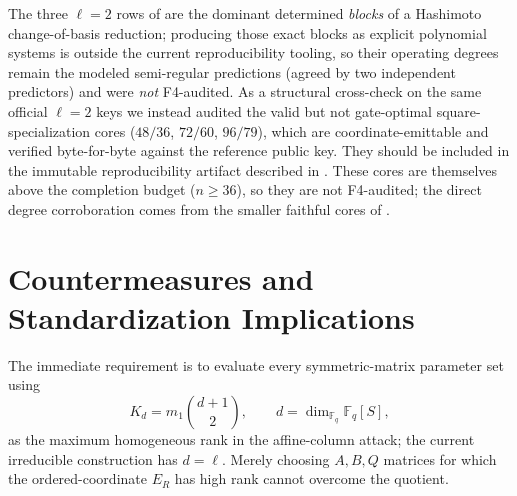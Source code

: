 \documentclass[11pt]{article}
\newcommand{\F}{\mathbb F}
\begin{document}
The three $\ell=2$ rows of  are the dominant determined
\emph{blocks} of a Hashimoto change-of-basis reduction; producing those exact
blocks as explicit polynomial systems is outside the current reproducibility
tooling, so their operating degrees remain the modeled semi-regular predictions
(agreed by two independent predictors) and were \emph{not} F4-audited.  As a
structural cross-check on the same official $\ell=2$ keys we instead audited the
valid but not gate-optimal square-specialization cores ($48/36$, $72/60$,
$96/79$), which are coordinate-emittable and verified byte-for-byte against the
reference public key.  They should be included in the immutable reproducibility
artifact described in .  These cores are themselves above the
completion budget ($n\ge36$), so they are not F4-audited; the direct degree
corroboration comes from the smaller faithful cores of .

\section{Countermeasures and Standardization Implications}\label{sec:countermeasures}

The immediate requirement is to evaluate every symmetric-matrix parameter set using
\[
 K_d=m_1\binom{d+1}{2},
 \qquad d=\dim_{\F_q}\F_q[S],
\]
as the maximum homogeneous rank in the affine-column attack; the current
irreducible construction has $d=\ell$.  Merely choosing $A,B,Q$ matrices for which the ordered-coordinate $E_R$ has high rank cannot overcome the quotient.
\end{document}
